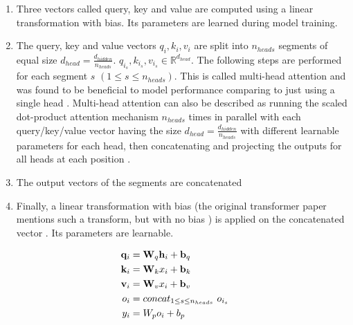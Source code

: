 \begin{enumerate}
\item Three vectors called query, key and value are computed using a linear transformation with bias. Its parameters are learned during model training.

\item The query, key and value vectors $q_i, k_i, v_i$ are split into $n_{heads}$ segments of equal size $d_{head} = \frac{d_{hidden}}{n_{heads}}$. $q_{i_s}, k_{i_s}, v_{i_s} \in \mathbb{R}^{d_{head}}$. The following steps are performed for each segment $s$ $(1 \leq s \leq n_{heads})$. This is called multi-head attention and was found to be beneficial to model performance comparing to just using a single head  \cite{alammar-gpt2}.
Multi-head attention can also be described as running the scaled dot-product attention mechanism $n_{heads}$ times in parallel with each query/key/value vector having the size $d_{head} = \frac{d_{hidden}}{n_{heads}}$ with different learnable parameters for each head, then concatenating and projecting the outputs for all heads at each position .

\item The output vectors of the segments are concatenated

\item Finally, a linear transformation with bias (the original transformer paper mentions such a transform, but with no bias ) is applied on the concatenated vector \cite{alammar-gpt2}. Its parameters are learnable.
\end{enumerate}


\begin{align}
	\mathbf{q}_i &= \mathbf{W}_q {\mathbf{h}}_i + \mathbf{b}_q \\
	\mathbf{k}_i &= \mathbf{W}_k x_i + \mathbf{b}_k \\
	\mathbf{v}_i &= \mathbf{W}_v x_i + \mathbf{b}_v \\
	o_i &= concat _{1 \leq s \leq n_{heads}} \ o_{i_s} \\
	y_i &= W_p o_i + b_p
\end{align}




